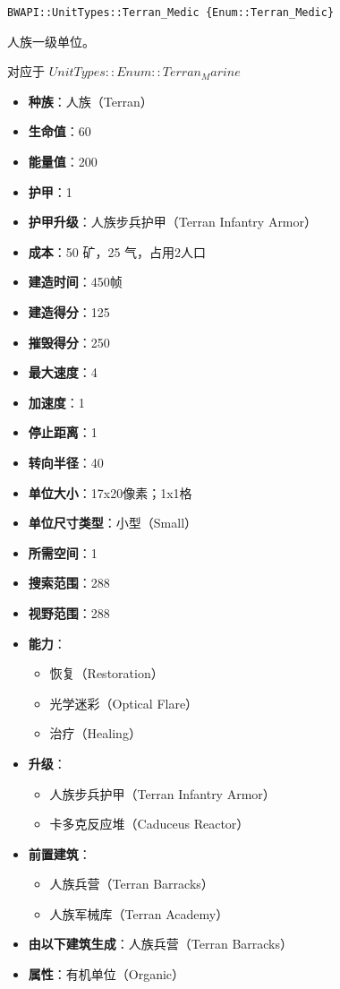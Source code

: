 \begin{tcolorbox}[colback=white, colframe=black!60!white, title=Terran\_Medic(), arc=0mm]
\begin{verbatim}
BWAPI::UnitTypes::Terran_Medic {Enum::Terran_Medic}
\end{verbatim}
人族一级单位。\par
对应于  $UnitTypes::Enum::Terran_Marine$ 
\begin{itemize}
    \item \textbf{种族}：人族（Terran）
    \item \textbf{生命值}：60
    \item \textbf{能量值}：200
    \item \textbf{护甲}：1
    \item \textbf{护甲升级}：人族步兵护甲（Terran Infantry Armor）
    \item \textbf{成本}：50 矿，25 气，占用2人口
    \item \textbf{建造时间}：450帧
    \item \textbf{建造得分}：125
    \item \textbf{摧毁得分}：250
    \item \textbf{最大速度}：4
    \item \textbf{加速度}：1
    \item \textbf{停止距离}：1
    \item \textbf{转向半径}：40
    \item \textbf{单位大小}：17x20像素；1x1格
    \item \textbf{单位尺寸类型}：小型（Small）
    \item \textbf{所需空间}：1
    \item \textbf{搜索范围}：288
    \item \textbf{视野范围}：288
    \item \textbf{能力}：
        \begin{itemize}
            \item 恢复（Restoration）
            \item 光学迷彩（Optical Flare）
            \item 治疗（Healing）
        \end{itemize}
    \item \textbf{升级}：
        \begin{itemize}
            \item 人族步兵护甲（Terran Infantry Armor）
            \item 卡多克反应堆（Caduceus Reactor）
        \end{itemize}
    \item \textbf{前置建筑}：
        \begin{itemize}
            \item 人族兵营（Terran Barracks）
            \item 人族军械库（Terran Academy）
        \end{itemize}
    \item \textbf{由以下建筑生成}：人族兵营（Terran Barracks）
    \item \textbf{属性}：有机单位（Organic）
\end{itemize}
\end{tcolorbox}


